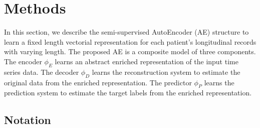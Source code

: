 \section{Methods}

In this section, we describe the semi-supervised AutoEncoder (AE) structure to learn a fixed length vectorial representation for each patient's longitudinal records with varying length. The proposed AE is a composite model of three components. The encoder $\phi_E$ learns an abstract enriched representation of the input time series data. The decoder $\phi_D$ learns the reconstruction system to estimate the original data from the enriched representation. The predictor $\phi_P$ learns the prediction system to estimate the target labels from the enriched representation.

\subsection{Notation}
